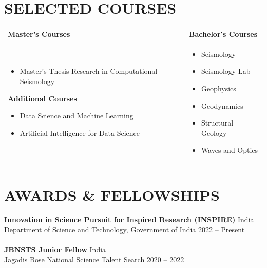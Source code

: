 \documentclass[a4paper,9pt]{extarticle}
\begin{document}
\section*{SELECTED COURSES}
\begin{tabularx}{1\textwidth}{
    >{\raggedright\arraybackslash}X
    >{\raggedright\arraybackslash}X }
\textbf{Master's Courses} & \textbf{Bachelor's Courses} \\[3pt]
\begin{minipage}[t]{\linewidth}
\begin{itemize}
    \item Master's Thesis Research in Computational Seismology
\end{itemize}
\vspace{6pt}
\textbf{Additional Courses}
\begin{itemize}
    \item Data Science and Machine Learning
    \item Artificial Intelligence for Data Science
\end{itemize}
\end{minipage}
&
\begin{minipage}[t]{\linewidth}
\begin{itemize}
    \item Seismology
    \item Seismology Lab
    \item Geophysics
    \item Geodynamics
    \item Structural Geology
    \item Waves and Optics

\end{itemize}
\end{minipage}
\end{tabularx}
\section*{AWARDS \& FELLOWSHIPS}
\textbf{Innovation in Science Pursuit for Inspired Research (INSPIRE)}  \hfill India\\ 
Department of Science and Technology, Government of India \hfill 2022 -- Present\\ \\
\textbf{JBNSTS Junior Fellow}  \hfill India\\ 
Jagadis Bose National Science Talent Search \hfill 2020 -- 2022
\end{document}
